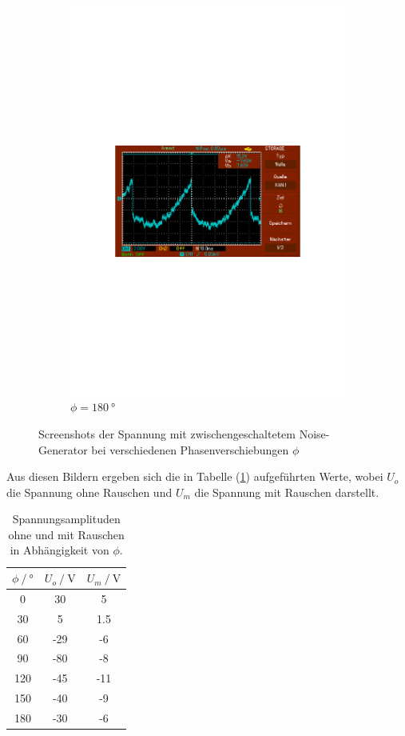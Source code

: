 \begin{figure}
\begin{subfigure}{0.3\textwidth}
      \includegraphics[width=\textwidth]{Daten/Noise/180.pdf}
      \caption{$\phi = \SI{180}{\degree}$}
      \label{fig:180n}
  \end{subfigure}
  \caption{Screenshots der Spannung mit zwischengeschaltetem Noise-Generator bei verschiedenen Phasenverschiebungen $\phi$}
  \label{fig:n}
\end{figure}

\noindent
Aus diesen Bildern ergeben sich die in Tabelle (\ref{tab:1}) aufgeführten Werte, wobei $U_o$ die Spannung ohne Rauschen
und $U_m$ die Spannung mit Rauschen darstellt.

\begin{table}
  \centering
  \begin{tabular}{c c c}
  \toprule
  {$\phi \mathbin{/} ° $} & {$U_o \mathbin{/} \si{\volt} $} &{$U_m \mathbin{/} \si{\volt} $}\\
  \midrule
  0   &    30  &     5  \\
  30  &    5   &     1.5\\
  60  &   -29  &     -6\\
  90  &   -80  &     -8\\
  120 &   -45  &     -11\\
  150 &   -40  &     -9\\
  180 &   -30  &     -6\\
  \bottomrule
  \end{tabular}
  \caption{Spannungsamplituden ohne und mit Rauschen in Abhängigkeit von $\phi$.}
  \label{tab:1}
  \end{table}

